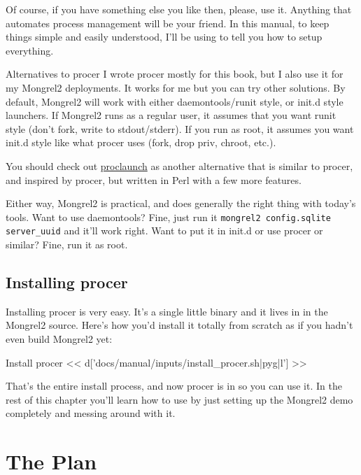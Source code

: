 Of course, if you have something else you like then, please, use it.  Anything that automates
process management will be your friend.  In this manual, to keep things simple and easily
understood, I'll be using  to tell you how to setup everything.

\begin{aside}{Alternatives to procer}
I wrote procer mostly for this book, but I also use it for my Mongrel2 deployments.
It works for me but you can try other solutions.  By default, Mongrel2 will work with
either daemontools/runit style, or init.d style launchers.  If Mongrel2 runs as a
regular user, it assumes that you want runit style (don't fork, write to stdout/stderr).
If you run as root, it assumes you want init.d style like what procer uses (fork, drop priv, 
chroot, etc.).

You should check out \href{http://github.com/peterkeen/proclaunch}{proclaunch} as another
alternative that is similar to procer, and inspired by procer, but written in Perl with a
few more features.

Either way, Mongrel2 is practical, and does generally the right thing with today's tools.
Want to use daemontools?  Fine, just run it \verb|mongrel2 config.sqlite server_uuid| and it'll
work right.  Want to put it in init.d or use procer or similar?  Fine, run it as root.
\end{aside}


\subsection{Installing procer}

Installing procer is very easy.  It's a single little binary and it lives in
 in the Mongrel2 source.  Here's how you'd install it
totally from scratch as if you hadn't even build Mongrel2 yet:

\begin{code}{Install procer}
<< d['docs/manual/inputs/install_procer.sh|pyg|l'] >>
\end{code}

That's the entire install process, and now procer is in 
so you can use it.  In the rest of this chapter you'll learn how to use 
by just setting up the Mongrel2 demo completely and messing around with it.



\section{The Plan}

